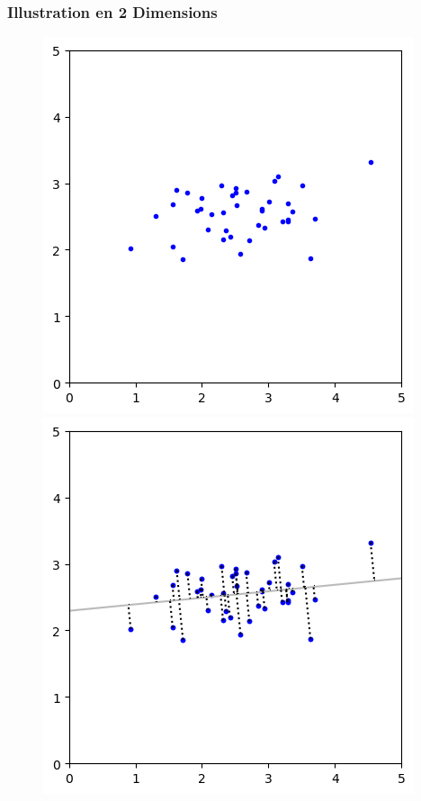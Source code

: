 \documentclass{beamer}
\theoremstyle{plain}
\theoremstyle{definition}
\begin{document}
\begin{frame}
  \frametitle{Illustration en 2 Dimensions}
  \begin{figure}
    \begin{overprint}
      \centering\includegraphics[scale=0.5]{src/beamer/figures/fig_pca_1.png}
      \centering\includegraphics[scale=0.5]{src/beamer/figures/fig_pca_3.png}
    \end{overprint}
  \end{figure}
\end{frame}
\end{document}
